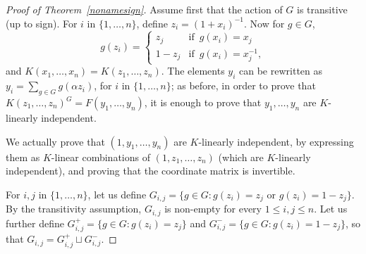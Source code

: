 \documentclass[12pt]{article}
\theoremstyle{plain}
\newtheorem{theorem}{Theorem}
\begin{document}
\begin{proof}[Proof of Theorem~\ref{nonamesign}]
  Assume first that the action of $G$ is transitive (up to sign).
  For $i$ in $\{1,\dots,n\}$, define $z_i = (1+x_i)^{-1} $. Now for $g
  \in G$, $$g(z_i) = \begin{cases} z_j & \text{if} \,\,\, g(x_i) = x_j
    \\ 1-z_j & \text{if} \,\,\, g(x_i) = x_j^{-1},
  \end{cases}$$ 
  and $K(x_1, \ldots , x_n) = K(z_1, \ldots, z_n).$ The elements $y_i$
  can be rewritten as $y_i = \sum_{g \in G} g ({\alpha}z_i)$, for $i$
  in $\{1, \ldots, n\}$; as before, in order to prove that
  $K(z_1,\ldots, z_n)^G = F(y_1, \ldots, y_{n})$, it is enough to
  prove that $y_1,\dots,y_n$ are $K$-linearly independent.

  We actually prove that $(1,y_1,\dots,y_n)$ are $K$-linearly
  independent, by expressing them as $K$-linear combinations of
  $(1,z_1,\dots,z_n)$ (which are $K$-linearly independent), and
  proving that the coordinate matrix is invertible.

  For $i,j$ in $\lbrace 1, \ldots , n \rbrace$, let us define $G_{i,j} =
  \lbrace g \in G : g(z_i) = z_j \,\, \text{or} \,\, g(z_i) = 1-z_j
  \rbrace $. By the transitivity assumption, $G_{i,j}$ is
  non-empty for every $1 \leq i,j \leq n$. Let us further define $G^{+}_{i,j}
  = \lbrace g \in G : g(z_i) = z_j \rbrace$ and $G^{-}_{i,j} =
  \lbrace g \in G : g(z_i) = 1- z_j \rbrace$, so that $G_{i,j}=
  G^{+}_{i,j}\sqcup G^{-}_{i,j}$.  


\end{proof}
\end{document}
